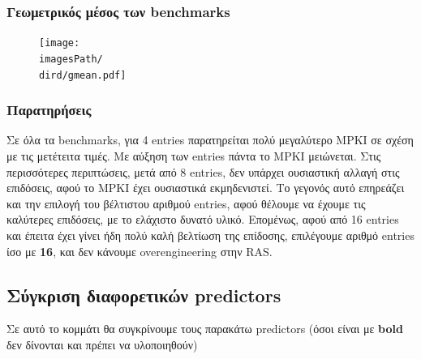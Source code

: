 \documentclass[12pt,a4paper]{article}
\newcommand{\imagesPath}{/home/nick/arch-ntua/ex02/graphs}
\newcommand{\dird}{4.4}
\begin{document}
			\subsubsection{Γεωμετρικός μέσος των benchmarks} 
			
				\begin{figure}[H]
					\begin{center}
						\texttt{[image: \\imagesPath/\\dird/gmean.pdf]}
					\end{center}
				\end{figure}
			
			\subsubsection{Παρατηρήσεις}
				Σε όλα τα benchmarks, για 4 entries παρατηρείται πολύ μεγαλύτερο MPKI σε σχέση με τις μετέτειτα τιμές. Με αύξηση των entries πάντα το MPKI μειώνεται. Στις περισσότερες περιπτώσεις, μετά από 8 entries, δεν υπάρχει ουσιαστική αλλαγή στις επιδόσεις, αφού το MPKI έχει ουσιαστικά εκμηδενιστεί. Το γεγονός αυτό επηρεάζει και την επιλογή του βέλτιστου αριθμού entries, αφού θέλουμε να έχουμε τις καλύτερες επιδόσεις, με το ελάχιστο δυνατό υλικό. Επομένως, αφού από 16 entries και έπειτα έχει γίνει ήδη πολύ καλή βελτίωση της επίδοσης, επιλέγουμε αριθμό entries ίσο με \textbf{16}, και δεν κάνουμε overengineering στην RAS.
			
		
		\subsection{Σύγκριση διαφορετικών predictors}
			Σε αυτό το κομμάτι θα συγκρίνουμε τους παρακάτω predictors (όσοι είναι με \textbf{bold} δεν δίνονται και πρέπει να υλοποιηθούν)
			
\end{document}
